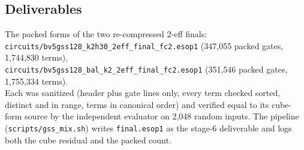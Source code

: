 \documentclass[11pt]{article}
\begin{document}
\subsection{Deliverables}

The packed forms of the two re-compressed 2-eff finals:\\
\texttt{circuits/bv5gss128\_k2h30\_2eff\_final\_fc2.esop1} (347,055 packed gates, 1,744,830 terms),\\
\texttt{circuits/bv5gss128\_bal\_k2\_2eff\_final\_fc2.esop1} (351,546 packed gates, 1,755,334 terms).\\
Each was sanitized (header plus gate lines only, every term checked sorted, distinct and in
range, terms in canonical order) and verified equal to its cube-form source by the independent
evaluator on 2,048 random inputs. The pipeline (\texttt{scripts/gss\_mix.sh}) writes
\texttt{final.esop1} as the stage-6 deliverable and logs both the cube residual and the packed
count.
\end{document}
